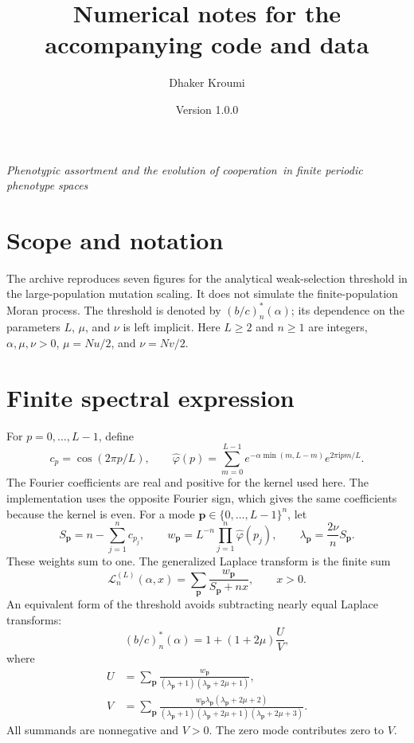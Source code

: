 \documentclass[10pt,a4paper]{article}
\title{Numerical notes for the accompanying code and data}
\author{Dhaker Kroumi}
\date{Version 1.0.0}
\newcommand{\crit}{\left(b/c\right)^{*}_{n}(\alpha)}
\newcommand{\Lap}{\mathcal L_n^{(L)}}
\begin{document}
\maketitle
\vspace{-1em}
\begin{center}
\emph{Phenotypic assortment and the evolution of cooperation\allowbreak\ in finite periodic phenotype spaces}
\end{center}

\section*{Scope and notation}
The archive reproduces seven figures for the analytical weak-selection
threshold in the large-population mutation scaling. It does not simulate
the finite-population Moran process. The threshold is denoted by $\crit$;
its dependence on the parameters $L$, $\mu$, and $\nu$ is left implicit.
Here $L\geq2$ and $n\geq1$ are integers, $\alpha,\mu,\nu>0$,
$\mu=Nu/2$, and $\nu=Nv/2$.

\section*{Finite spectral expression}
For $p=0,\ldots,L-1$, define
\begin{equation*}
 c_p=\cos(2\pi p/L),\qquad
 \widehat\varphi(p)=\sum_{m=0}^{L-1}
 e^{-\alpha\min(m,L-m)}e^{2\pi\mathrm{i}pm/L}.
\end{equation*}
The Fourier coefficients are real and positive for the kernel used here.
The implementation uses the opposite Fourier sign, which gives the same
coefficients because the kernel is even. For a mode
$\mathbf p\in\{0,\ldots,L-1\}^n$, let
\begin{equation*}
 S_{\mathbf p}=n-\sum_{j=1}^{n}c_{p_j},\qquad
 w_{\mathbf p}=L^{-n}\prod_{j=1}^{n}\widehat\varphi(p_j),\qquad
 \lambda_{\mathbf p}=\frac{2\nu}{n}S_{\mathbf p}.
\end{equation*}
These weights sum to one. The generalized Laplace transform is the finite sum
\begin{equation}\label{eq:transform}
 \Lap(\alpha,x)=\sum_{\mathbf p}\frac{w_{\mathbf p}}{S_{\mathbf p}+nx},\qquad x>0.
\end{equation}
An equivalent form of the threshold avoids subtracting nearly equal
Laplace transforms:
\begin{equation}\label{eq:threshold}
 \crit=1+(1+2\mu)\frac{U}{V},
\end{equation}
where
\begin{align}
 U&=\sum_{\mathbf p}\frac{w_{\mathbf p}}
 {(\lambda_{\mathbf p}+1)(\lambda_{\mathbf p}+2\mu+1)},\label{eq:U}\\
 V&=\sum_{\mathbf p}\frac{w_{\mathbf p}\lambda_{\mathbf p}(\lambda_{\mathbf p}+2\mu+2)}
 {(\lambda_{\mathbf p}+1)(\lambda_{\mathbf p}+2\mu+1)(\lambda_{\mathbf p}+2\mu+3)}.\label{eq:V}
\end{align}
All summands are nonnegative and $V>0$. The zero mode contributes zero to $V$.
\end{document}
